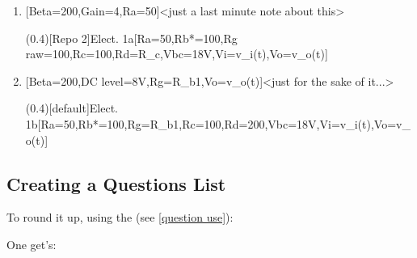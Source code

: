 \documentclass[10pt]{article}
\begin{document}
\begin{enumerate}
  \item {}[Beta=200,Gain=4,Ra=50\Omega]<just a last minute note about this>\par
  \ftikzQuestion(0.4)[Repo 2]{Elect. 1a}[Ra=50\Omega,Rb*=100\Omega,Rg raw=100,Rc=100,Rd=R_c,Vbc=18V,Vi=v_i(t),Vo=v_o(t)]
  
  \item {}[Beta=200,DC level=8V,Rg=R_{b1},Vo=v_o(t)]<just for the sake of it...>\par
  \ftikzQuestion(0.4)[default]{Elect. 1b}[Ra=50\Omega,Rb*=100\Omega,Rg=R_{b1},Rc=100,Rd=200\Omega,Vbc=18V,Vi=v_i(t),Vo=v_o(t)]
\end{enumerate}

\subsection{Creating a Questions List}
To round it up, using the \tsobj{\QuestionsList} (see \ref{question use}):
\begin{codestore}[Qlist]
\QuestionsList
\end{codestore}


One get's:

\QuestionsList
\end{document}
